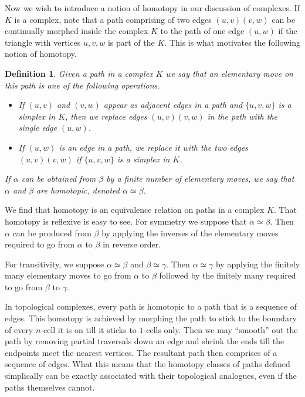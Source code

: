 \documentclass[12pt]{article}
\newtheorem{definition}{Definition}
\theoremstyle{definition}
\numberwithin{equation}{theorem}
\begin{document}
Now we wish to introduce a notion of homotopy in our discussion of complexes. If $K$ is a complex, note that a path comprising of two edges $(u,v)(v,w)$ can be continually morphed inside the complex $K$ to the path of one edge $(u,w)$ if the triangle with vertices $u,v,w$ is part of the $K$. This is what motivates the following notion of homotopy.

\begin{definition}
  Given a path in a complex $K$ we say that an \emph{elementary move} on this path is one of the following operations.
  \begin{itemize}
  \item If $(u,v)$ and $(v,w)$ appear as adjacent edges in a path and $\{u,v,w\}$ is a simplex in $K$, then we replace edges $(u,v)(v,w)$ in the path with the single edge $(u,w)$.
  \item If $(u,w)$ is an edge in a path, we replace it with the two edges $(u,v)(v,w)$ if $\{u,v,w\}$ is a simplex in $K$.
  \end{itemize}
  If $\alpha$ can be obtained from $\beta$ by a finite number of elementary moves, we say that $\alpha$ and $\beta$ are \emph{homotopic}, denoted $\alpha \simeq \beta$.
\end{definition}


We find that homotopy is an equivalence relation on paths in a complex $K$. That homotopy is reflexive is easy to see. For symmetry  we suppose that $\alpha \simeq \beta$. Then  $\alpha$ can be produced from $\beta$ by applying the inverses of the elementary moves required to go from $\alpha$ to $\beta$ in reverse order. %

For transitivity, we suppose $\alpha \simeq \beta$ and $\beta \simeq \gamma$. Then $\alpha \simeq \gamma$ by applying the finitely many elementary moves to go from $\alpha$ to $\beta$ followed by the finitely many required to go from $\beta$ to $\gamma$.

In topological complexes, every path is homotopic to a path that is a sequence of edges. This homotopy is achieved by morphing the path to stick to the boundary of every $n$-cell it is on till it sticks to $1$-cells only. Then we may ``smooth'' out the path by removing partial traversals down an edge and shrink the ends till the endpoints meet the nearest vertices. The resultant path then comprises of a sequence of edges. What this means that the homotopy classes of paths defined simplically can be exactly associated with their topological analogues, even if the paths themselves cannot.
\end{document}
